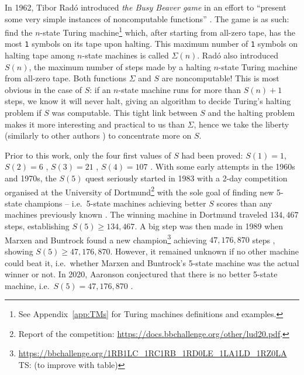 \documentclass[a4paper,british]{article}
\theoremstyle{definition} %
\numberwithin{equation}{section}
\theoremstyle{definition} %
\newcommand{\ts}[1]{{\color{red}#1}}
\newcommand{\sone}{\texttt{1}\xspace}
\newcommand{\BBtheFifth}{47{,}176{,}870}
\newcommand{\radofull}{Tibor Rad\'o\xspace}
\newcommand{\rado}{Rad\'o\xspace}
\begin{document}
\newcommand{\noncomput}{noncomputable\xspace}
\newcommand{\BBfull}{Busy Beaver\xspace}
\newcommand{\Coq}{Coq\xspace}
\newcommand{\CoqProofReleaseURL}{\url{https://github.com/ccz181078/Coq-BB5}}

\newcommand{\ie}{i.e.~}
\newcommand{\eg}{e.g.~}

In 1962, \radofull introduced \textit{the \BBfull game} in an effort to ``present some very simple instances of \noncomput functions'' \cite{Rado_1962}. The game is as such: find the $n$-state Turing machine\footnote{See Appendix~\ref{app:TMs} for Turing machines definitions and examples.} which, after starting from all-zero tape, has the most \sone symbols on its tape upon halting. This maximum number of \sone symbols on halting tape among $n$-state machines is called $\Sigma(n)$. \rado also introduced $S(n)$, the maximum number of steps made by a halting $n$-state Turing machine from all-zero tape. Both functions $\Sigma$ and $S$ are \noncomput! This is most obvious in the case of $S$: if an $n$-state machine runs for more than $S(n)+1$ steps, we know it will never halt, giving an algorithm to decide Turing's halting problem if $S$ was computable. This tight link between $S$ and the halting problem makes it more interesting and practical to us than $\Sigma$, hence we take the liberty (similarly to other authors \cite{BusyBeaverFrontier,otherexamples?}) to concentrate more on $S$.

Prior to this work, only the four first values of $S$ had been proved: $S(1)=1$, $S(2)=6$ \cite{Rado_1962}, $S(3) = 21$ \cite{Lin1963}, $S(4) = 107$ \cite{Brady83}. With some early attempts in the 1960s and 1970s, the $S(5)$ quest seriously started in 1983 with a 2-day competition organised at the University of Dortmund\footnote{Report of the competition: \url{https://docs.bbchallenge.org/other/lud20.pdf}.} with the sole goal of finding new 5-state champions -- \ie 5-state machines achieving better $S$ scores than any machines previously known \cite{PMichel_website,michel2019busy}. The winning machine in Dortmund traveled $134,467$ steps, establishing $S(5) \geq 134,467$. A big step was then made in 1989 when Marxen and Buntrock found a new champion\footnote{\url{https://bbchallenge.org/1RB1LC_1RC1RB_1RD0LE_1LA1LD_1RZ0LA} \ts{TS: (to improve with table)}} achieving $\BBtheFifth$ steps \cite{Marxen_1990}, showing $S(5) \geq \BBtheFifth$. However, it remained unknown if no other machine could beat it, \ie whether Marxen and Buntrock's 5-state machine was the actual winner or not. In 2020, Aaronson conjectured that there is no better 5-state machine, \ie $S(5) = \BBtheFifth$ \cite{BusyBeaverFrontier}.
\end{document}

